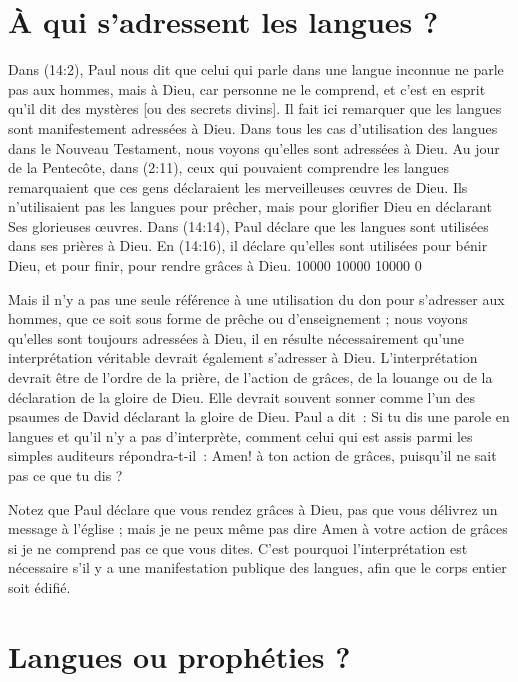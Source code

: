 \section{\`A qui s'adressent les langues ?}


Dans (14:2), Paul nous dit que celui qui parle dans une
 langue inconnue \og ne parle pas aux hommes, mais à Dieu, car personne
 ne le comprend, et c'est en esprit qu'il dit des mystères
 [ou des secrets divins]. \fg{} Il fait ici remarquer que les langues
 sont manifestement adressées à Dieu. Dans tous les cas d'utilisation
 des langues dans le Nouveau Testament, nous voyons qu'elles sont adressées
 à Dieu. Au jour de la Pentecôte, dans (2:11),
 ceux qui pouvaient comprendre les langues remarquaient que ces gens
 déclaraient les merveilleuses œuvres de Dieu. Ils n'utilisaient pas
 les langues pour prêcher, mais pour glorifier Dieu
 en déclarant Ses glorieuses œuvres.
 Dans (14:14), Paul déclare que les langues sont utilisées
 dans ses prières à Dieu. En (14:16), il déclare
 qu'elles sont utilisées pour bénir Dieu, et pour finir,
 pour rendre grâces à Dieu.
 \begingroup{} 10000 10000 10000 0
 \par\endgroup

Mais il n'y a pas une seule référence à une utilisation du don
 pour s'adresser aux hommes, que ce soit sous forme de prêche
 ou d'enseignement ; nous voyons qu'elles sont toujours adressées à Dieu,
 il en résulte nécessairement qu'une interprétation véritable devrait
 également s'adresser à Dieu. L'interprétation devrait être de l'ordre
 de la prière, de l'action de grâces, de la louange ou de la déclaration
 de la gloire de Dieu. Elle devrait souvent sonner comme l'un des psaumes
 de David déclarant la gloire de Dieu. Paul a dit~:
 \og Si tu dis une parole en langues et qu'il n'y a pas d'interprète,
 comment celui qui est assis parmi les simples auditeurs
 répondra-t-il~: Amen! à ton action de grâces, puisqu'il ne sait pas
 ce que tu dis ? \fg{}

Notez que Paul déclare que vous rendez grâces à Dieu, pas que vous délivrez
 un message à l'église ; mais je ne peux même pas dire \og Amen \fg{}
 à votre action de grâces si je ne comprend pas ce que vous dites.
 C'est pourquoi l'interprétation est nécessaire s'il y a une manifestation
 publique des langues, afin que le corps entier soit édifié.


\section{Langues ou proph\'eties ?}

